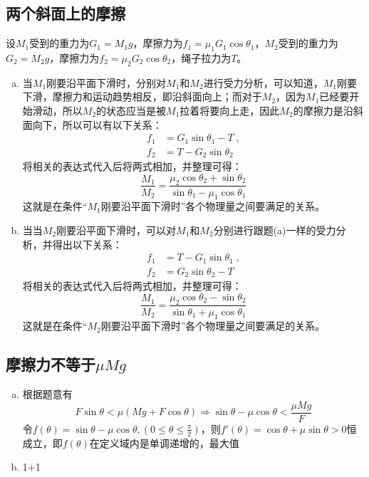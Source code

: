 \subsection{两个斜面上的摩擦}
设$M_1$受到的重力为$G_1 = M_1g$，摩擦力为$f_1 = \mu_1 G_1\cos \theta_1$，$M_2$受到的重力为$G_2 = M_2g$，摩擦力为$f_2 = \mu_2 G_2\cos \theta_2$，绳子拉力为$T$。
\begin{enumerate}[(a)]
	\item 
	当$M_1$刚要沿平面下滑时，分别对$M_1$和$M_2$进行受力分析，可以知道，$M_1$刚要下滑，摩擦力和运动趋势相反，即沿斜面向上；而对于$M_2$，因为$M_1$已经要开始滑动，所以$M_2$的状态应当是被$M_1$拉着将要向上走，因此$M_2$的摩擦力是沿斜面向下，所以可以有以下关系：
	\[
		\begin{aligned}
			f_1 & = G_1\sin \theta_1 - T \;,\\
			f_2 & = T - G_2\sin \theta_2
		\end{aligned}
		\]
	将相关的表达式代入后将两式相加，并整理可得：
	\[
		\frac{M_1}{M_2} = \frac{\mu_2\cos\theta_2 + \sin\theta_2}{\sin\theta_1 - \mu_1\cos\theta_1}
		\]
	这就是在条件“$M_1$刚要沿平面下滑时”各个物理量之间要满足的关系。
	\item
	当当$M_2$刚要沿平面下滑时，可以对$M_1$和$M_2$分别进行跟题(a)一样的受力分析，并得出以下关系：
	\[
		\begin{aligned}
			f_1 & = T - G_1\sin \theta_1 \;,\\
			f_2 & = G_2\sin \theta_2 - T
		\end{aligned}
		\]
	将相关的表达式代入后将两式相加，并整理可得：
	\[
		\frac{M_1}{M_2} = \frac{\mu_2\cos\theta_2 - \sin\theta_2}{\sin\theta_1 + \mu_1\cos\theta_1}
		\]
	这就是在条件“$M_2$刚要沿平面下滑时”各个物理量之间要满足的关系。
\end{enumerate}





\subsection{摩擦力不等于$\mu Mg$}
\begin{enumerate}[(a)]
	\item
	根据题意有
	\[
		F\sin \theta < \mu (Mg + F\cos\theta) \Rightarrow \sin\theta - \mu \cos\theta < \frac{\mu Mg}{F}
		\]
	令$f(\theta) = \sin\theta - \mu \cos\theta, (0 \leqslant \theta \leqslant \frac{\pi}{2})$，则$f'(\theta) = \cos\theta + \mu \sin\theta > 0$恒成立，即$f(\theta)$在定义域内是单调递增的，最大值
	\item
	1+1
\end{enumerate}
